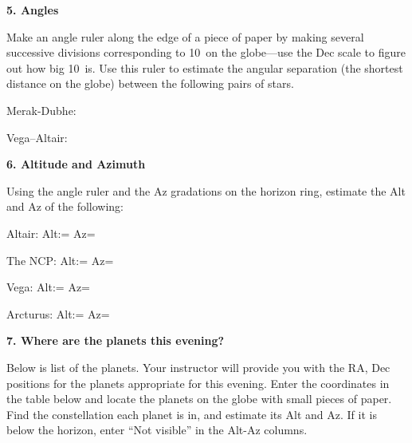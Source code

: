 \bigskip\noindent
{\bf 5. Angles}

\bigskip\noindent
Make an angle ruler along the edge of a piece of paper by making
several successive divisions corresponding to 10\deg\ on the
globe---use the Dec scale to figure out how big 10\deg\ is.  Use this
ruler to estimate the angular separation (the shortest distance on the
globe) between the following pairs of stars.

\bigskip
Merak-Dubhe: \makebox[4cm]{\hrulefill}

Vega--Altair: \makebox[4cm]{\hrulefill}
  
\bigskip
\noindent
{\bf 6. Altitude and Azimuth}

\bigskip
\noindent
Using the angle ruler and the Az gradations on the horizon ring, 
estimate the Alt and Az of the following:

\medskip   
Altair: Alt:= \makebox[4cm]{\hrulefill} Az= \makebox[4cm]{\hrulefill}

The NCP:  Alt:= \makebox[4cm]{\hrulefill} Az= \makebox[4cm]{\hrulefill}

Vega: Alt:= \makebox[4cm]{\hrulefill} Az= \makebox[4cm]{\hrulefill}

Arcturus: Alt:= \makebox[4cm]{\hrulefill} Az= \makebox[4cm]{\hrulefill}

\bigskip

\clearpage 
\noindent
{\bf 7. Where are the planets this evening?}

\bigskip
\noindent
Below is list of the planets. Your instructor will provide you with the RA, Dec
positions for the planets appropriate for this evening. Enter the coordinates in the table below
and locate the planets on the globe with small pieces of paper. Find
the constellation each planet is in, and estimate its Alt and Az. If
it is below the horizon, enter ``Not visible'' in the Alt-Az columns.

